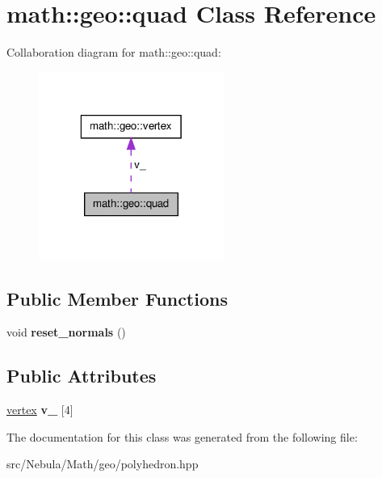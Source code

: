 \hypertarget{classmath_1_1geo_1_1quad}{\section{math\-:\-:geo\-:\-:quad \-Class \-Reference}
\label{classmath_1_1geo_1_1quad}
}


\-Collaboration diagram for math\-:\-:geo\-:\-:quad\-:\nopagebreak
\begin{figure}[H]
\begin{center}
\leavevmode
\includegraphics[width=172pt]{classmath_1_1geo_1_1quad__coll__graph}
\end{center}
\end{figure}
\subsection*{\-Public \-Member \-Functions}
\begin{DoxyCompactItemize}
\item 
\hypertarget{classmath_1_1geo_1_1quad_a61f7422d3d82b7acab0aabd71b68fccf}{void {\bfseries reset\-\_\-normals} ()}\label{classmath_1_1geo_1_1quad_a61f7422d3d82b7acab0aabd71b68fccf}

\end{DoxyCompactItemize}
\subsection*{\-Public \-Attributes}
\begin{DoxyCompactItemize}
\item 
\hypertarget{classmath_1_1geo_1_1quad_a6625bbd8467b8a853aae1f4f2a2362ec}{\hyperlink{classmath_1_1geo_1_1vertex}{vertex} {\bfseries v\-\_\-} \mbox{[}4\mbox{]}}\label{classmath_1_1geo_1_1quad_a6625bbd8467b8a853aae1f4f2a2362ec}

\end{DoxyCompactItemize}


\-The documentation for this class was generated from the following file\-:\begin{DoxyCompactItemize}
\item 
src/\-Nebula/\-Math/geo/polyhedron.\-hpp\end{DoxyCompactItemize}
